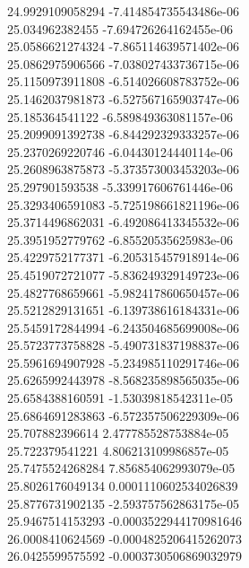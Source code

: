 {24.9929109058294 -7.414854735543486e-06 \\
25.034962382455 -7.694726264162455e-06 \\
25.0586621274324 -7.865114639571402e-06 \\
25.0862975906566 -7.038027433736715e-06 \\
25.1150973911808 -6.514026608783752e-06 \\
25.1462037981873 -6.527567165903747e-06 \\
25.185364541122 -6.589849363081157e-06 \\
25.2099091392738 -6.844292329333257e-06 \\
25.2370269220746 -6.04430124440114e-06 \\
25.2608963875873 -5.373573003453203e-06 \\
25.297901593538 -5.339917606761446e-06 \\
25.3293406591083 -5.725198661821196e-06 \\
25.3714496862031 -6.492086413345532e-06 \\
25.3951952779762 -6.85520535625983e-06 \\
25.4229752177371 -6.205315457918914e-06 \\
25.4519072721077 -5.836249329149723e-06 \\
25.4827768659661 -5.982417860650457e-06 \\
25.5212829131651 -6.139738616184331e-06 \\
25.5459172844994 -6.243504685699008e-06 \\
25.5723773758828 -5.490731837198837e-06 \\
25.5961694907928 -5.234985110291746e-06 \\
25.6265992443978 -8.568235898565035e-06 \\
25.6584388160591 -1.53039818542311e-05 \\
25.6864691283863 -6.572357506229309e-06 \\
25.707882396614 2.477785528753884e-05 \\
25.722379541221 4.806213109986857e-05 \\
25.7475524268284 7.856854062993079e-05 \\
25.8026176049134 0.0001110602534026839 \\
25.8776731902135 -2.593757562863175e-05 \\
25.9467514153293 -0.0003522944170981646 \\
26.0008410624569 -0.0004825206415262073 \\
26.0425599575592 -0.0003730506869032979 \\
}
